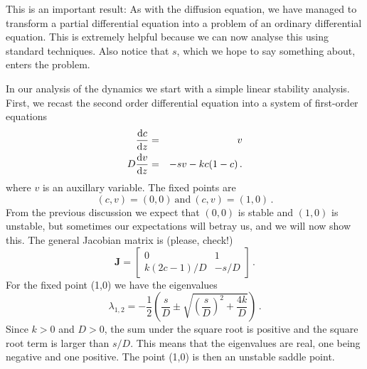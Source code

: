 This is an important result: As with the diffusion equation, we have managed to transform a 
partial differential equation into a problem of an ordinary differential equation. 
This is extremely helpful because we can now analyse this using
standard techniques. Also notice that $s$, which we hope to say something
about, enters the problem. 

In our analysis of the dynamics we start with a simple linear stability
analysis. First, we recast the second order differential equation into a system of first-order equations 
\begin{eqnarray}
  \frac{\mathrm{d} c}{\mathrm{d} z} &=& v \nonumber \\
  D\frac{\mathrm{d} v}{\mathrm{d} z} &=& -sv - kc(1-c) \, .
\end{eqnarray}
where $v$ is an auxillary variable. The fixed points are 
\begin{equation}
  (c, v)=(0,0)  \ \text{and} \   (c, v)=(1,0) \, .
\end{equation}
From the previous discussion we expect that $(0,0)$ is stable and $(1,0)$ is
unstable, but sometimes our expectations will betray us, and we will now show this. 
The general Jacobian matrix is (please, check!)
\begin{equation}
  \mathbf{J} =
  \begin{bmatrix}
    0 & 1 \\
    k(2c-1)/D & -s/D
    \end{bmatrix} \, .
\end{equation}
For the fixed point (1,0) we have the eigenvalues
\begin{equation}
  \lambda_{1,2}=-\frac{1}{2}\left(
    \frac{s}{D} \pm \sqrt{\left(\frac{s}{D}\right)^2 + \frac{4k}{D}} 
  \right) \, .
\end{equation}
Since $k>0$ and $D>0$, the sum under the square root is positive and the square root term is 
larger than $s/D$. This means that the eigenvalues are real, one being negative and one positive.
The point (1,0) is then an unstable saddle point. 

